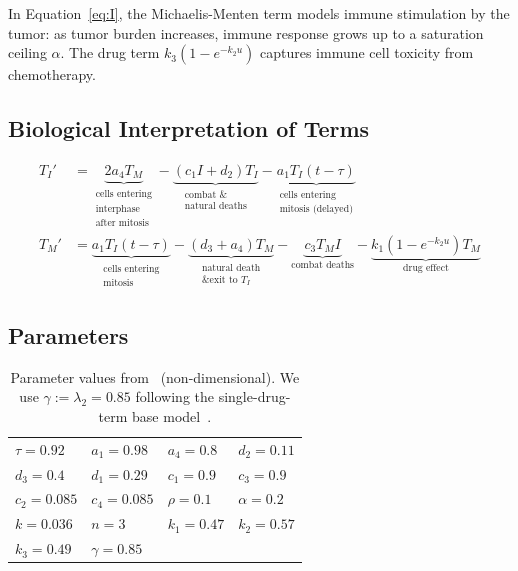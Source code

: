In Equation~\ref{eq:I}, the Michaelis-Menten term models immune stimulation by the tumor: as tumor burden increases, immune response grows up to a saturation ceiling $\alpha$. The drug term $k_3(1-e^{-k_2u})$ captures immune cell toxicity from chemotherapy.

\subsection{Biological Interpretation of Terms}

\begin{align*}
  T_I' &= \underbrace{2a_4T_M}_{\substack{\text{cells entering}\\\text{interphase}\\\text{after mitosis}}}
         -\underbrace{(c_1I + d_2)T_I}_{\substack{\text{combat \&}\\\text{natural deaths}}}
         -\underbrace{a_1T_I(t-\tau)}_{\substack{\text{cells entering}\\\text{mitosis (delayed)}}} \\[6pt]
  T_M' &= \underbrace{a_1T_I(t-\tau)}_{\substack{\text{cells entering}\\\text{mitosis}}}
         -\underbrace{(d_3+a_4)T_M}_{\substack{\text{natural death}\\\text{\& exit to }T_I}}
         -\underbrace{c_3T_MI}_{\text{combat deaths}}
         -\underbrace{k_1(1-e^{-k_2u})T_M}_{\text{drug effect}}
\end{align*}

\subsection{Parameters}

\begin{table}[H]
  \caption{Parameter values from~\cite{villasana_heuristic_2004} (non-dimensional). We use
    $\gamma := \lambda_2 = 0.85$ following the single-drug-term base
    model~\cite{villasana_delay_2003}.}
  \label{tab:params}
  \small
  \begin{tabular}{llll}
    \toprule
    $\tau = 0.92$ & $a_1 = 0.98$   & $a_4 = 0.8$     & $d_2 = 0.11$  \\
    $d_3 = 0.4$   & $d_1 = 0.29$   & $c_1 = 0.9$     & $c_3 = 0.9$   \\
    $c_2 = 0.085$ & $c_4 = 0.085$  & $\rho = 0.1$    & $\alpha = 0.2$\\
    $k = 0.036$   & $n = 3$        & $k_1 = 0.47$    & $k_2 = 0.57$  \\
    $k_3 = 0.49$  & $\gamma = 0.85$&                 &               \\
    \bottomrule
  \end{tabular}
\end{table}
